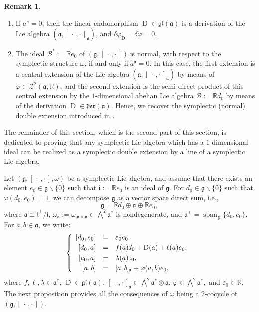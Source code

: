 \documentclass[final,1p,times,nopreprintline]{elsarticle}
\theoremstyle{definition}
\newtheorem{remark}{Remark}[section]
\numberwithin{equation}{section}
\newcommand{\rel}{\mathbb{R}}
\newcommand{\w}{\omega}
\newcommand{\g}{\mathfrak{g}}
\newcommand{\ai}{\mathfrak{a}}
\newcommand{\Span}{\operatorname{span}}
\numberwithin{equation}{section}
\newcommand{\D}{\operatorname{D}}
\newcommand{\gl}{\mathfrak{gl}}
\newcommand{\cro}{[\,\cdot\,,\cdot\,]}
\newcommand{\bi}{\mathcal{B}}
\begin{document}
\begin{remark}
	\begin{enumerate}
\item If $a^\ai=0$, then the linear endomorphism $\D\in\gl(\ai)$ is a derivation of the Lie algebra $(\ai,\cro_\ai)$, and $\delta\varphi_{\D}=\delta\varphi=0$.
\item The ideal $\bi^*:=\rel e_0$ of $(\g,\cro)$ is normal, with respect to the symplectic structure $\w$, if and only if $a^\ai=0.$ In this case, the first extension is a central extension of the Lie algebra $(\ai,\cro_\ai)$ by means of $\varphi\in\mathcal{Z}^2(\ai,\rel)$, and the second extension is the semi-direct product of this central extension by the $1$-dimensional abelian Lie algebra $\bi:=\rel d_0$ by means of the derivation $\D\in\mathfrak{der}(\ai)$. Hence, we recover the symplectic (normal) double extension introduced in \cite{MR-Q}.
	\end{enumerate}
\end{remark}

The remainder of this section, which is the second part of this section, is dedicated to proving that any symplectic Lie algebra which has a $1$-dimensional ideal can be realized as a symplectic double extension by a line of a symplectic Lie algebra.

Let $(\g,[\,\cdot\,,\cdot\,],\w)$ be a symplectic Lie algebra, and assume that there exists an element $e_0\in\g\backslash\{0\}$ such that $\mathfrak{i}:=\rel e_0$ is an ideal of $\g$. For $d_0\in\g\backslash\{0\}$ such that $\w(d_0,e_0)=1$, we can decompose $\g$ as a vector space direct sum, i.e.,
\begin{equation*}
	\g=\rel d_0\oplus\ai\oplus\rel e_0,
\end{equation*}
where $\ai\cong\mathfrak{i}^\perp/\mathfrak{i}$, $\w_\ai:=\w_{|\ai\times\ai}\in\bigwedge^2\ai^*$ is nondegenerate, and $\ai^\perp=\Span_\rel\{d_0,e_0\}$. For $a,b\in\ai$, we write:
\begin{equation}\label{eqSolDim1}
	\left\{
	\begin{array}{r c l}\vspace{1mm}
		\left[d_0,e_0\right]&=&\varepsilon_0e_0,\\\vspace{1mm}
		\left[d_0,a\right]&=&f(a)d_0+\D(a)+\ell(a)e_0,\\ \vspace{1mm}
		\left[e_0,a\right]&=&\lambda(a)e_0,\hfill\\
		\left[a,b\right]&=&[a,b]_\ai+\varphi(a,b)e_0,\hfill
	\end{array}
	\right.\\
\end{equation}
where $f,\ell,\lambda\in\ai^*,\,\D\in\gl(\ai),\,[\,\cdot\,,\cdot\,]_\ai\in\bigwedge^2\ai^*\otimes\ai,\,\varphi\in\bigwedge^2\ai^*,$ and $\varepsilon_0\in\rel$. The next proposition provides all the consequences of $\w$ being a $2$-cocycle of $(\g,\cro)$.
\end{document}

